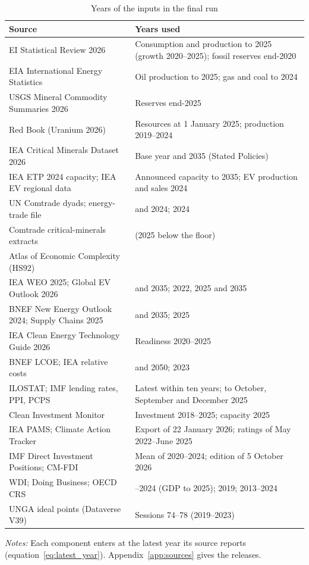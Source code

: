 \begin{table}[tbp]
\centering
\begin{threeparttable}
\caption{Years of the inputs in the final run}\label{tab:oa_data_years}
\footnotesize
\begin{tabularx}{\textwidth}{@{}>{\raggedright\arraybackslash}p{5.2cm} >{\raggedright\arraybackslash}X@{}}
\toprule
Source & Years used\\
\midrule
EI Statistical Review 2026 & Consumption and production to 2025 (growth 2020--2025); fossil
  reserves end-2020\\
EIA International Energy Statistics & Oil production to 2025; gas and coal to 2024\\
USGS Mineral Commodity Summaries 2026 & Reserves end-2025\\
Red Book (Uranium 2026) & Resources at 1 January 2025; production 2019--2024\\
IEA Critical Minerals Dataset 2026 & Base year and 2035 (Stated Policies)\\
IEA ETP 2024 capacity; IEA EV regional data & Announced capacity to 2035; EV production and sales
  2024\\
UN Comtrade dyads; energy-trade file & 2020 and 2024; 2024\\
Comtrade critical-minerals extracts & 2024 (2025 below the floor)\\
Atlas of Economic Complexity (HS92) & 2023\\
IEA WEO 2025; Global EV Outlook 2026 & 2024 and 2035; 2022, 2025 and 2035\\
BNEF New Energy Outlook 2024; Supply Chains 2025 & 2024 and 2035; 2025\\
IEA Clean Energy Technology Guide 2026 & Readiness 2020--2025\\
BNEF LCOE; IEA relative costs & 2025 and 2050; 2023\\
ILOSTAT; IMF lending rates, PPI, PCPS & Latest within ten years; to October, September and
  December 2025\\
Clean Investment Monitor & Investment 2018--2025; capacity 2025\\
IEA PAMS; Climate Action Tracker & Export of 22 January 2026; ratings of May 2022--June 2025\\
IMF Direct Investment Positions; CM-FDI & Mean of 2020--2024; edition of 5 October 2026\\
WDI; Doing Business; OECD CRS & 2022--2024 (GDP to 2025); 2019; 2013--2024\\
UNGA ideal points (Dataverse V39) & Sessions 74--78 (2019--2023)\\
\bottomrule
\end{tabularx}
\begin{tablenotes}[flushleft]\footnotesize
\item \textit{Notes:} Each component enters at the latest year its source reports
(equation~\eqref{eq:latest_year}). Appendix~\ref{app:sources} gives the releases.
\end{tablenotes}
\end{threeparttable}
\end{table}

